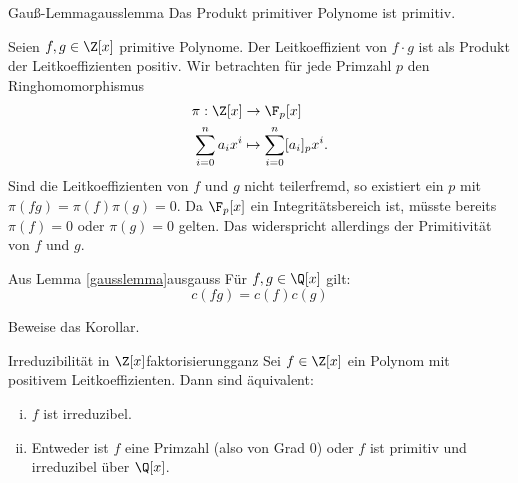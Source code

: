 \begin{lemma}{Gauß-Lemma}{gausslemma}
Das Produkt primitiver Polynome ist primitiv.
\end{lemma}
\begin{beweis}
Seien $f,g \in \Z[x]$ primitive Polynome. Der Leitkoeffizient von $f\cdot g$ ist als Produkt der Leitkoeffizienten positiv. Wir betrachten für jede Primzahl $p$ den Ringhomomorphismus
\begin{equation}
\begin{split}
\pi:\Z[x] &\to \F_p[x]\\
\sum_{i=0}^n a_i x^i &\mapsto \sum_{i=0}^n [a_i]_p x^i.
\end{split}
\end{equation}
Sind die Leitkoeffizienten von $f$ und $g$ nicht teilerfremd, so existiert ein $p$ mit $\pi(fg) = \pi(f) \pi(g) = 0$. Da $\F_p[x]$ ein Integritätsbereich ist, müsste bereits $\pi(f)=0$ oder $\pi(g)=0$ gelten. Das widerspricht allerdings der Primitivität von $f$ und $g$.
\end{beweis}
\begin{korollar}{Aus Lemma \ref{gausslemma}}{ausgauss}
Für $f,g \in \Q[x]$ gilt:
\begin{equation}
c(fg) = c(f)c(g)
\end{equation}
\end{korollar}
\begin{übung}
Beweise das Korollar.
\end{übung}
\begin{satz}{Irreduzibilität in $\Z[x]$}{faktorisierungganz}
Sei $f \in \Z[x]$ ein Polynom mit positivem Leitkoeffizienten. Dann sind äquivalent:
\begin{enumerate}[(i)]
\item $f$ ist irreduzibel. 
\item Entweder ist $f$ eine Primzahl (also von Grad $0$) oder $f$ ist primitiv und irreduzibel über $\Q[x]$.
\end{enumerate}
\end{satz}
